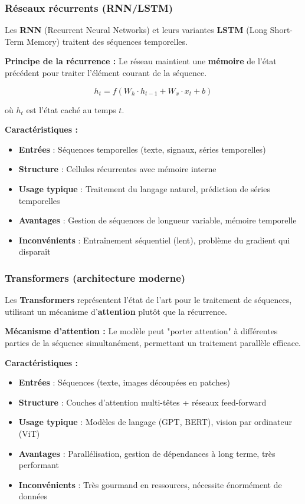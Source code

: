 \documentclass[11pt,a4paper,twocolumn]{article}
\begin{document}
\subsubsection{Réseaux récurrents (RNN/LSTM)}

Les \textbf{RNN} (Recurrent Neural Networks) et leurs variantes \textbf{LSTM} (Long Short-Term Memory) traitent des séquences temporelles.

\textbf{Principe de la récurrence :}
Le réseau maintient une \textbf{mémoire} de l'état précédent pour traiter l'élément courant de la séquence.

$$h_t = f(W_h \cdot h_{t-1} + W_x \cdot x_t + b)$$

où $h_t$ est l'état caché au temps $t$.

\textbf{Caractéristiques :}
\begin{itemize}
    \item \textbf{Entrées} : Séquences temporelles (texte, signaux, séries temporelles)
    \item \textbf{Structure} : Cellules récurrentes avec mémoire interne
    \item \textbf{Usage typique} : Traitement du langage naturel, prédiction de séries temporelles
    \item \textbf{Avantages} : Gestion de séquences de longueur variable, mémoire temporelle
    \item \textbf{Inconvénients} : Entraînement séquentiel (lent), problème du gradient qui disparaît
\end{itemize}

\subsubsection{Transformers (architecture moderne)}

Les \textbf{Transformers} représentent l'état de l'art pour le traitement de séquences, utilisant un mécanisme d'\textbf{attention} plutôt que la récurrence.

\textbf{Mécanisme d'attention :}
Le modèle peut "porter attention" à différentes parties de la séquence simultanément, permettant un traitement parallèle efficace.

\textbf{Caractéristiques :}
\begin{itemize}
    \item \textbf{Entrées} : Séquences (texte, images découpées en patches)
    \item \textbf{Structure} : Couches d'attention multi-têtes + réseaux feed-forward
    \item \textbf{Usage typique} : Modèles de langage (GPT, BERT), vision par ordinateur (ViT)
    \item \textbf{Avantages} : Parallélisation, gestion de dépendances à long terme, très performant
    \item \textbf{Inconvénients} : Très gourmand en ressources, nécessite énormément de données
\end{itemize}
\end{document}
